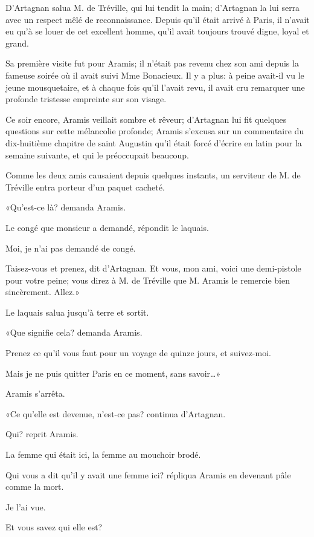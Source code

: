 D'Artagnan salua M. de Tréville, qui lui tendit la main; d'Artagnan la lui serra avec un respect mêlé de reconnaissance. Depuis qu'il était arrivé à Paris, il n'avait eu qu'à se louer de cet excellent homme, qu'il avait toujours trouvé digne, loyal et grand. 

Sa première visite fut pour Aramis; il n'était pas revenu chez son ami depuis la fameuse soirée où il avait suivi Mme Bonacieux. Il y a plus: à peine avait-il vu le jeune mousquetaire, et à chaque fois qu'il l'avait revu, il avait cru remarquer une profonde tristesse empreinte sur son visage. 

Ce soir encore, Aramis veillait sombre et rêveur; d'Artagnan lui fit quelques questions sur cette mélancolie profonde; Aramis s'excusa sur un commentaire du dix-huitième chapitre de saint Augustin qu'il était forcé d'écrire en latin pour la semaine suivante, et qui le préoccupait beaucoup. 

Comme les deux amis causaient depuis quelques instants, un serviteur de M. de Tréville entra porteur d'un paquet cacheté. 

«Qu'est-ce là? demanda Aramis. 

\speak  Le congé que monsieur a demandé, répondit le laquais. 

\speak  Moi, je n'ai pas demandé de congé. 

\speak  Taisez-vous et prenez, dit d'Artagnan. Et vous, mon ami, voici une demi-pistole pour votre peine; vous direz à M. de Tréville que M. Aramis le remercie bien sincèrement. Allez.» 

Le laquais salua jusqu'à terre et sortit. 

«Que signifie cela? demanda Aramis. 

\speak  Prenez ce qu'il vous faut pour un voyage de quinze jours, et suivez-moi. 

\speak  Mais je ne puis quitter Paris en ce moment, sans savoir\dots» 

Aramis s'arrêta. 

«Ce qu'elle est devenue, n'est-ce pas? continua d'Artagnan. 

\speak  Qui? reprit Aramis. 

\speak  La femme qui était ici, la femme au mouchoir brodé. 

\speak  Qui vous a dit qu'il y avait une femme ici? répliqua Aramis en devenant pâle comme la mort. 

\speak  Je l'ai vue. 

\speak  Et vous savez qui elle est? 

